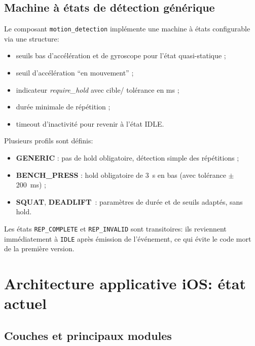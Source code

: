 \documentclass[a4paper,11pt]{article}
\begin{document}
\subsection{Machine à états de détection générique}

Le composant \texttt{motion\_detection} implémente une machine à états configurable via une structure:
\begin{itemize}
  \item seuils bas d'accélération et de gyroscope pour l'état quasi-statique ;
  \item seuil d'accélération ``en mouvement'' ;
  \item indicateur \emph{require\_hold} avec cible/ tolérance en ms ;
  \item durée minimale de répétition ;
  \item timeout d'inactivité pour revenir à l'état IDLE.
\end{itemize}

Plusieurs profils sont définis:
\begin{itemize}
  \item \textbf{GENERIC} : pas de hold obligatoire, détection simple des répétitions ;
  \item \textbf{BENCH\_PRESS} : hold obligatoire de 3~s en bas (avec tolérance $\pm$200~ms) ;
  \item \textbf{SQUAT}, \textbf{DEADLIFT}~: paramètres de durée et de seuils adaptés, sans hold.
\end{itemize}

Les états \texttt{REP\_COMPLETE} et \texttt{REP\_INVALID} sont transitoires: ils reviennent immédiatement à \texttt{IDLE} après émission de l'événement, ce qui évite le code mort de la première version.

\section{Architecture applicative iOS: état actuel}

\subsection{Couches et principaux modules}
\end{document}
